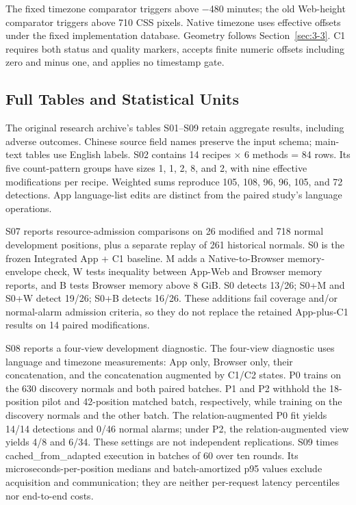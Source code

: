 The fixed timezone comparator triggers above −480 minutes; the old Web-height comparator triggers above 710 CSS pixels. Native timezone uses effective offsets under the fixed implementation database. Geometry follows Section~\ref{sec:3-3}. C1 requires both status and quality markers, accepts finite numeric offsets including zero and minus one, and applies no timestamp gate.

\hypertarget{app:3}{%
\subsection{Full Tables and Statistical Units}\label{app:3}}

The original research archive's tables S01--S09 retain aggregate results, including adverse outcomes. Chinese source field names preserve the input schema; main-text tables use English labels. S02 contains 14 recipes × 6 methods = 84 rows. Its five count-pattern groups have sizes 1, 1, 2, 8, and 2, with nine effective modifications per recipe. Weighted sums reproduce 105, 108, 96, 96, 105, and 72 detections. App language-list edits are distinct from the paired study's language operations.

S07 reports resource-admission comparisons on 26 modified and 718 normal development positions, plus a separate replay of 261 historical normals. S0 is the frozen Integrated App + C1 baseline. M adds a Native-to-Browser memory-envelope check, W tests inequality between App-Web and Browser memory reports, and B tests Browser memory above 8 GiB. S0 detects 13/26; S0+M and S0+W detect 19/26; S0+B detects 16/26. These additions fail coverage and/or normal-alarm admission criteria, so they do not replace the retained App-plus-C1 results on 14 paired modifications.

S08 reports a four-view development diagnostic. The four-view diagnostic uses language and timezone measurements: App only, Browser only, their concatenation, and the concatenation augmented by C1/C2 states. P0 trains on the 630 discovery normals and both paired batches. P1 and P2 withhold the 18-position pilot and 42-position matched batch, respectively, while training on the discovery normals and the other batch. The relation-augmented P0 fit yields 14/14 detections and 0/46 normal alarms; under P2, the relation-augmented view yields 4/8 and 6/34. These settings are not independent replications. S09 times cached\_\allowbreak{}from\_\allowbreak{}adapted execution in batches of 60 over ten rounds. Its microseconds-per-position medians and batch-amortized p95 values exclude acquisition and communication; they are neither per-request latency percentiles nor end-to-end costs.

